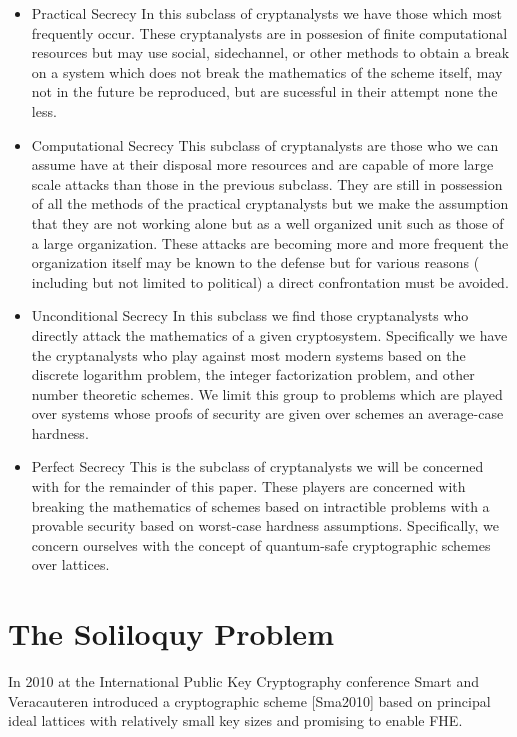 \begin{itemize}
\item{Practical Secrecy} In this subclass of cryptanalysts we have those
which most frequently occur. These cryptanalysts are in possesion of
finite computational resources but may use social, sidechannel, or
other methods to obtain a break on a system which does not break the
mathematics of the scheme itself, may not in the future be reproduced,
but are sucessful in their attempt none the less.

\item{Computational Secrecy} This subclass of cryptanalysts are those who
we can assume have at their disposal more resources and are capable of
more large scale attacks than those in the previous subclass. They are
still in possession of all the methods of the practical cryptanalysts
but we make the assumption that they are not working alone but as a
well organized unit such as those of a large organization. These
attacks are becoming more and more frequent the organization itself may
be known to the defense but for various reasons ( including but not
limited to political) a direct confrontation must be avoided.

\item{Unconditional Secrecy} In this subclass we find those cryptanalysts
who directly attack the mathematics of a given cryptosystem.
Specifically we have the cryptanalysts who play against most modern
systems based on the discrete logarithm problem, the integer
factorization problem, and other number theoretic schemes. We limit
this group to problems which are played over systems whose proofs of
security are given over schemes an average-case hardness.

\item{Perfect Secrecy} This is the subclass of cryptanalysts we will be
concerned with for the remainder of this paper. These players are
concerned with breaking the mathematics of schemes based on intractible
problems with a provable security based on worst-case hardness
assumptions. Specifically, we concern ourselves with the concept of
quantum-safe cryptographic schemes over lattices.
\end{itemize}

\section{The Soliloquy Problem}

In 2010 at the International Public Key Cryptography conference Smart
and Veracauteren introduced a cryptographic scheme [Sma2010] based on
principal ideal lattices with relatively small key sizes and promising
to enable FHE.

